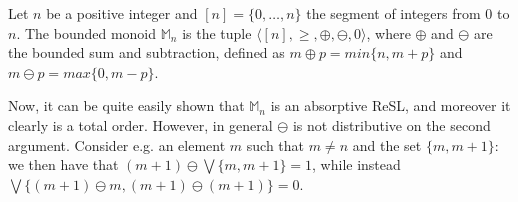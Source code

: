 \documentclass{llncs}
\def\monid{{\mathbf 0}}
\def\monop{\otimes}
\def\odiv{\, {\ominus\hspace{-7.7pt} \div} \,}
\def\monid{\mathbf{1}}
\begin{document}
\begin{example}
\label{nodist2}
%
Let $n$ be a positive integer and $[n] = \{0, \ldots, n\}$ the segment of integers from $0$ to $n$. The bounded monoid $\mathbb{M}_n$ 
is the tuple $\langle [n], \geq, \oplus, \ominus, 0 \rangle$, where $\oplus$ and $\ominus$ are the bounded sum and subtraction, 
defined as $m\oplus p = min\{n, m+p\}$ and $m\ominus p = max\{0,m-p\}$.

Now, it can be quite easily shown that $\mathbb{M}_n$ is an absorptive ReSL, and moreover it clearly is a total order.
%
However, in general $\ominus$ is not distributive on the second argument. Consider e.g. an element $m$ such that 
$m \neq n$ and the set $\{m, m+1\}$:
we then have that $(m+1) \ominus \bigvee\{m, m+1\} = 1$,
while instead $\bigvee\{(m+1) \ominus m, (m+1) \ominus (m+1)\} = 0$.
\end{example}
\end{document}

